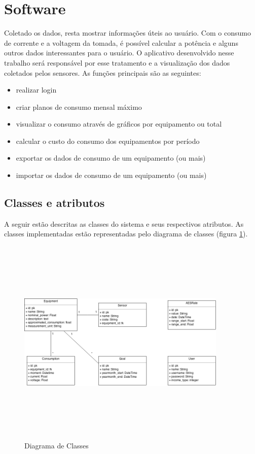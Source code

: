 \section{Software}
\label{Sec:software}

Coletado os dados, resta mostrar informações úteis ao usuário. Com o consumo de corrente e a voltagem da tomada, é possível calcular a potência e alguns outros dados interessantes para o usuário. O aplicativo desenvolvido nesse trabalho será responsável por esse tratamento e a visualização dos dados coletados pelos sensores. As funções principais são as seguintes:

\begin{itemize}
\item{realizar login}
\item{criar planos de consumo mensal máximo}
\item{visualizar o consumo através de gráficos por equipamento ou total}
\item{calcular o custo do consumo dos equipamentos por período}
\item{exportar os dados de consumo de um equipamento (ou mais)}
\item{importar os dados de consumo de um equipamento (ou mais)}
\end{itemize}
%
\subsection{Classes e atributos}

A seguir estão descritas as classes do sistema e seus respectivos atributos. As classes implementadas estão representadas pelo diagrama de classes (figura \ref{fig:diagrama-classes}).

\begin{figure}[H]
\begin{center}
\includegraphics[width=10cm,height=10cm,keepaspectratio]{figuras/diagrama_classes.png}
\caption{\label{fig:diagrama-classes} Diagrama de Classes}
\end{center}
\end{figure}

